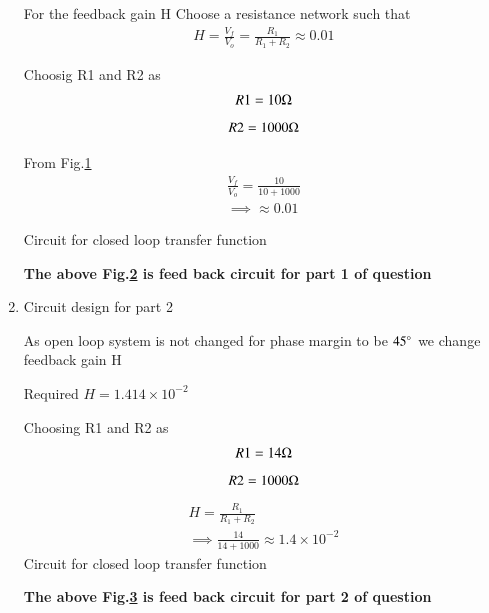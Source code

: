 \begin{enumerate}[label=\thesubsection.\arabic*.,ref=\thesubsection.\theenumi]
For the feedback gain H
Choose a resistance network such that 
\begin{align}
H = \frac{V_{f}}{V_{o}} = \frac{R_{1}}{R_{1}+R_{2}} \approx 0.01
\end{align}

Choosig R1 and R2 as
\begin{align}
R1 = 10\ohm
\end{align}
\begin{align}
R2 = 1000\ohm
\end{align}

\begin{figure}[ht!]
	\begin{center}
		\resizebox{\columnwidth/2}{!}{}
	\end{center}
	\caption{}
	\label{fig:ee18btech11034_figc}
\end{figure}
From Fig.\ref{fig:ee18btech11034_figc}
\begin{align}
\frac {V_{f}}{V_{o}} = \frac{10}{10+1000}
\\
\implies \approx 0.01
\end{align}

Circuit for closed loop transfer function 
\begin{figure}[ht!]
	\begin{center}
		\resizebox{\columnwidth}{!}{}
	\end{center}
	\caption{}
	\label{fig:ee18btech11034_figd}
\end{figure}

\textbf{The above Fig.\ref{fig:ee18btech11034_figd} is feed back circuit for part 1 of question}

\item Circuit design for part 2

As open loop system is not changed for phase margin to be $45\degree$ we change feedback gain H

Required $H = 1.414 \times 10^{-2}$

Choosing R1 and R2 as
\begin{align}
R1 = 14\ohm
\end{align}
\begin{align}
R2 = 1000\ohm
\end{align}
\begin{align}
H = \frac{R_{1}}{R_{1}+R_{2}}
\\
\implies \frac{14}{14+1000} \approx 1.4 \times 10^{-2}
\end{align}
Circuit for closed loop transfer function 
\begin{figure}[ht!]
	\begin{center}
		\resizebox{\columnwidth}{!}{}
	\end{center}
	\caption{}
	\label{fig:ee18btech11034_fige}
\end{figure}

\textbf{The above Fig.\ref{fig:ee18btech11034_fige} is feed back circuit for part 2 of question}

\end{enumerate}
